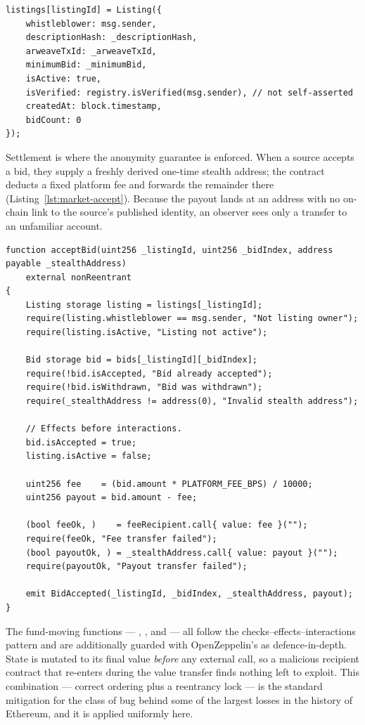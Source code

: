 \begin{lstlisting}[language=Solidity,caption={Verified flag sourced from the registry (\code{Marketplace.sol}).},label={lst:market-listing}]
listings[listingId] = Listing({
    whistleblower: msg.sender,
    descriptionHash: _descriptionHash,
    arweaveTxId: _arweaveTxId,
    minimumBid: _minimumBid,
    isActive: true,
    isVerified: registry.isVerified(msg.sender), // not self-asserted
    createdAt: block.timestamp,
    bidCount: 0
});
\end{lstlisting}

Settlement is where the anonymity guarantee is enforced. When a source accepts a
bid, they supply a freshly derived one-time stealth address; the contract deducts
a fixed platform fee and forwards the remainder there
(Listing~\ref{lst:market-accept}). Because the payout lands at an address with no
on-chain link to the source's published identity, an observer sees only a transfer
to an unfamiliar account.

\begin{lstlisting}[language=Solidity,caption={Paying out to a one-time stealth address under checks--effects--interactions (\code{Marketplace.sol}).},label={lst:market-accept}]
function acceptBid(uint256 _listingId, uint256 _bidIndex, address payable _stealthAddress)
    external nonReentrant
{
    Listing storage listing = listings[_listingId];
    require(listing.whistleblower == msg.sender, "Not listing owner");
    require(listing.isActive, "Listing not active");

    Bid storage bid = bids[_listingId][_bidIndex];
    require(!bid.isAccepted, "Bid already accepted");
    require(!bid.isWithdrawn, "Bid was withdrawn");
    require(_stealthAddress != address(0), "Invalid stealth address");

    // Effects before interactions.
    bid.isAccepted = true;
    listing.isActive = false;

    uint256 fee    = (bid.amount * PLATFORM_FEE_BPS) / 10000;
    uint256 payout = bid.amount - fee;

    (bool feeOk, )    = feeRecipient.call{ value: fee }("");
    require(feeOk, "Fee transfer failed");
    (bool payoutOk, ) = _stealthAddress.call{ value: payout }("");
    require(payoutOk, "Payout transfer failed");

    emit BidAccepted(_listingId, _bidIndex, _stealthAddress, payout);
}
\end{lstlisting}

The fund-moving functions --- , , and
 --- all follow the checks--effects--interactions pattern and are
additionally guarded with OpenZeppelin's  as
defence-in-depth. State is mutated to its final value \emph{before} any external
call, so a malicious recipient contract that re-enters during the value transfer
finds nothing left to exploit. This combination --- correct ordering plus a reentrancy
lock --- is the standard mitigation for the class of bug behind some of the largest
losses in the history of Ethereum, and it is applied uniformly here.

